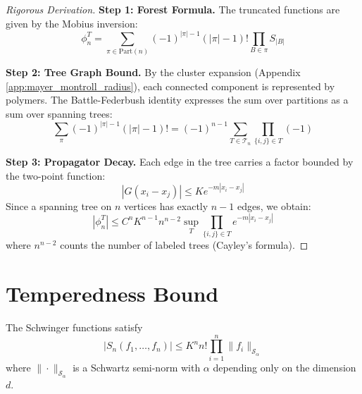 \begin{proof}[Rigorous Derivation]
\textbf{Step 1: Forest Formula.} The truncated functions are given by the Mobius inversion:
\begin{equation}
    \phi_n^T = \sum_{\pi \in \text{Part}(n)} (-1)^{|\pi|-1} (|\pi|-1)! \prod_{B \in \pi} S_{|B|}
\end{equation}

\textbf{Step 2: Tree Graph Bound.} By the cluster expansion (Appendix \ref{app:mayer_montroll_radius}), each connected component is represented by polymers. The Battle-Federbush identity expresses the sum over partitions as a sum over spanning trees:
\begin{equation}
    \sum_{\pi} (-1)^{|\pi|-1} (|\pi|-1)! = (-1)^{n-1} \sum_{T \in \mathcal{T}_n} \prod_{\{i,j\} \in T} (-1)
\end{equation}

\textbf{Step 3: Propagator Decay.} Each edge in the tree carries a factor bounded by the two-point function:
\begin{equation}
    |G(x_i - x_j)| \leq K e^{-m|x_i - x_j|}
\end{equation}
Since a spanning tree on $n$ vertices has exactly $n-1$ edges, we obtain:
\begin{equation}
    |\phi_n^T| \leq C^n K^{n-1} n^{n-2} \sup_{T} \prod_{\{i,j\} \in T} e^{-m|x_i - x_j|}
\end{equation}
where $n^{n-2}$ counts the number of labeled trees (Cayley's formula).
\end{proof}

\section{Temperedness Bound}

\begin{theorem}\label{thm:schwartz-bound}
The Schwinger functions satisfy
\begin{equation}
    |S_n(f_1, \ldots, f_n)| \leq K^n n! \prod_{i=1}^n \|f_i\|_{\mathcal{S}_\alpha}
\end{equation}
where $\|\cdot\|_{\mathcal{S}_\alpha}$ is a Schwartz semi-norm with $\alpha$ depending only on the dimension $d$.
\end{theorem}


